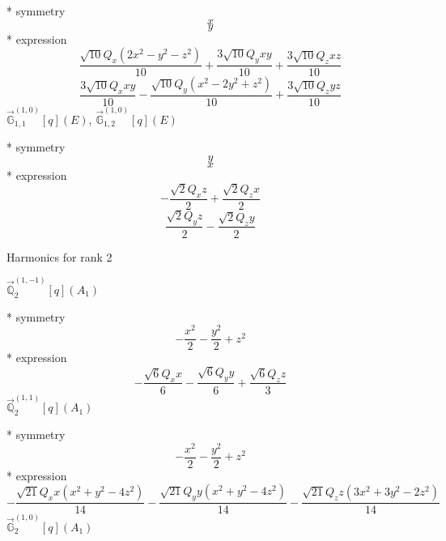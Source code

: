 \documentclass[fleqn,8pt]{jsarticle}
\begin{document}
\noindent\quad ** symmetry
\begin{dmath*}
x
\end{dmath*}
\begin{dmath*}
y
\end{dmath*}
\noindent\quad ** expression
\begin{dmath*}
\frac{\sqrt{10} Q_{x} \left(2 x^{2} - y^{2} - z^{2}\right)}{10} + \frac{3 \sqrt{10} Q_{y} x y}{10} + \frac{3 \sqrt{10} Q_{z} x z}{10}
\end{dmath*}
\begin{dmath*}
\frac{3 \sqrt{10} Q_{x} x y}{10} - \frac{\sqrt{10} Q_{y} \left(x^{2} - 2 y^{2} + z^{2}\right)}{10} + \frac{3 \sqrt{10} Q_{z} y z}{10}
\end{dmath*}
\noindent\quad $\vec{\mathbb{G}}_{1,1}^{(1,0)}[q](E)$, $\vec{\mathbb{G}}_{1,2}^{(1,0)}[q](E)$

\noindent\quad ** symmetry
\begin{dmath*}
y
\end{dmath*}
\begin{dmath*}
x
\end{dmath*}
\noindent\quad ** expression
\begin{dmath*}
- \frac{\sqrt{2} Q_{x} z}{2} + \frac{\sqrt{2} Q_{z} x}{2}
\end{dmath*}
\begin{dmath*}
\frac{\sqrt{2} Q_{y} z}{2} - \frac{\sqrt{2} Q_{z} y}{2}
\end{dmath*}

\noindent * Harmonics for rank 2

\noindent\quad $\vec{\mathbb{Q}}_{2}^{(1,-1)}[q](A_{1})$

\noindent\quad ** symmetry
\begin{dmath*}
- \frac{x^{2}}{2} - \frac{y^{2}}{2} + z^{2}
\end{dmath*}
\noindent\quad ** expression
\begin{dmath*}
- \frac{\sqrt{6} Q_{x} x}{6} - \frac{\sqrt{6} Q_{y} y}{6} + \frac{\sqrt{6} Q_{z} z}{3}
\end{dmath*}
\noindent\quad $\vec{\mathbb{Q}}_{2}^{(1,1)}[q](A_{1})$

\noindent\quad ** symmetry
\begin{dmath*}
- \frac{x^{2}}{2} - \frac{y^{2}}{2} + z^{2}
\end{dmath*}
\noindent\quad ** expression
\begin{dmath*}
- \frac{\sqrt{21} Q_{x} x \left(x^{2} + y^{2} - 4 z^{2}\right)}{14} - \frac{\sqrt{21} Q_{y} y \left(x^{2} + y^{2} - 4 z^{2}\right)}{14} - \frac{\sqrt{21} Q_{z} z \left(3 x^{2} + 3 y^{2} - 2 z^{2}\right)}{14}
\end{dmath*}
\noindent\quad $\vec{\mathbb{G}}_{2}^{(1,0)}[q](A_{1})$
\end{document}
